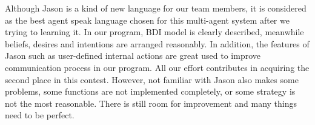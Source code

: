 Although Jason is a kind of new language for our team members, it is considered as the best agent speak language chosen for this multi-agent system after we trying to learning it.
In our program, BDI model is clearly described, meanwhile beliefs, desires and intentions are arranged reasonably.
In addition, the features of Jason such as user-defined internal actions are great used to improve communication process in our program.
All our effort contributes in acquiring the second place in this contest.
However, not familiar with Jason also makes some problems, some functions are not implemented completely, or some strategy is not the most reasonable.
There is still room for improvement and many things need to be perfect.
